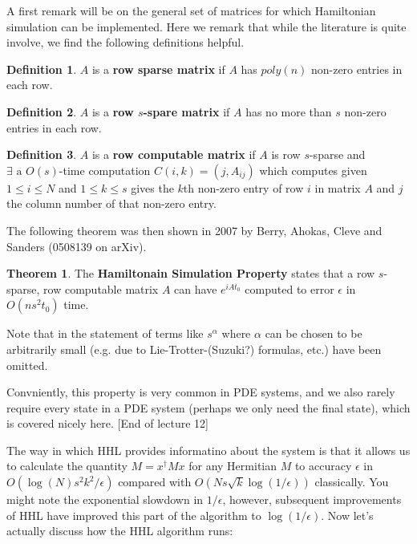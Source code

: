 \documentclass{article}
\theoremstyle{definition}
\newtheorem{definition}{Definition}
\newtheorem{theorem}{Theorem}
\begin{document}
A first remark will be on the general set of matrices for which Hamiltonian
simulation can be implemented. Here we remark that while the literature is quite
involve, we find the following definitions helpful.

\begin{definition}
  $A$ is a \textbf{row sparse matrix} if $A$ has $poly(n)$ non-zero entries in
  each row.
\end{definition}

\begin{definition}
  $A$ is a \textbf{row $s$-spare matrix} if $A$ has no more than $s$ non-zero
  entries in each row.
\end{definition}

\begin{definition}
  $A$ is a \textbf{row computable matrix} if $A$ is row $s$-sparse and $\exists
  \text{ a }O(s)$-time computation $C(i, k) = (j, A_{ij})$ which computes given
  $1 \leq i \leq N$ and $1 \leq k \leq s$ gives the $k$th non-zero entry of row
  $i$ in matrix $A$ and $j$ the column number of that non-zero entry.
\end{definition}

The following theorem was then shown in 2007 by Berry, Ahokas, Cleve and
Sanders (0508139 on arXiv).

\begin{theorem}
  The \textbf{Hamiltonain Simulation Property} states that a row $s$-sparse, row
  computable matrix $A$ can have $e^{iAt_0}$ computed to error $\epsilon$ in
  $O(n s^2 t_0)$ time.
\end{theorem}

Note that in the statement of terms like $s^\alpha$ where $\alpha$ can be chosen
to be arbitrarily small (e.g. due to Lie-Trotter-(Suzuki?) formulas, etc.) have
been omitted.

Convniently, this property is very common in PDE systems, and we also rarely
require every state in a PDE system (perhaps we only need the final state),
which is covered nicely here. [End of lecture 12]

The way in which HHL provides informatino about the system is that it allows us
to calculate the quantity $M = x^\dagger M x$ for any Hermitian $M$ to accuracy
$\epsilon$ in $O(\log(N)s^2 k^2 / \epsilon)$ compared with $O(Ns \sqrt{k} \log(1
/ \epsilon))$ classically. You might note the exponential slowdown in $1 /
\epsilon$, however, subsequent improvements of HHL have improved this part of
the algorithm to $\log(1 / \epsilon)$. Now let's actually discuss how the HHL
algorithm runs:
\end{document}
